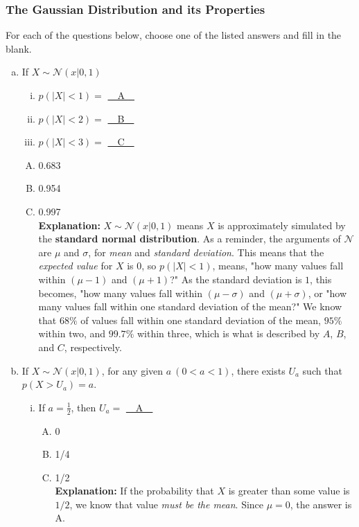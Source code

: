 \documentclass[11pt]{article} %
\begin{document}
\subsubsection{The Gaussian Distribution and its Properties}
For each of the questions below, choose one of the listed answers and fill in the blank.
\begin{enumerate}[(a)]
\item If $X \sim \mathcal{N} (x|0,1)$
\begin{enumerate}[i. ]
\item $p(|X|<1) = $ \underline{~~A~~}
\item $p(|X|<2) = $ \underline{~~B~~}
\item $p(|X|<3) = $ \underline{~~C~~}
\end{enumerate}
\begin{enumerate}[A) ]
\item 0.683
\item 0.954
\item 0.997 \\
{\bf Explanation:} $X \sim \mathcal{N}(x|0,1)$ means $X$ is approximately simulated by the {\bf standard normal distribution}. As a reminder, the arguments of $\mathcal{N}$ are $\mu$ and $\sigma$, for {\em mean} and {\em standard deviation}. This means that the {\em expected value} for $X$ is 0, so $p(|X| < 1)$, means, "how many values fall within $(\mu - 1)$ and $(\mu + 1)$?" As the standard deviation is $1$, this becomes, "how many values fall within $(\mu - \sigma)$ and $(\mu + \sigma)$, or "how many values fall within one standard deviation of the mean?" We know that $68\%$ of values fall within one standard deviation of the mean, $95\%$ within two, and $99.7\%$ within three, which is what is described by $A$, $B$, and $C$, respectively.
\end{enumerate}
\item If $X \sim \mathcal{N}(x|0,1)$, for any given $a~(0 < a < 1)$, there exists $U_a$ such that $p(X>U_a) = a$.
\begin{enumerate}[i. ]
\item If $a = \frac{1}{2}$, then $U_a = $  \underline{~~A~~}
\begin{enumerate}[A. ]
\item 0
\item 1/4
\item 1/2 \\
{\bf Explanation:} If the probability that $X$ is greater than some value is $1/2$, we know that value {\em must be the mean}. Since $\mu = 0$, the answer is A.

\end{enumerate}
\end{enumerate}
\end{enumerate}
\end{document}
